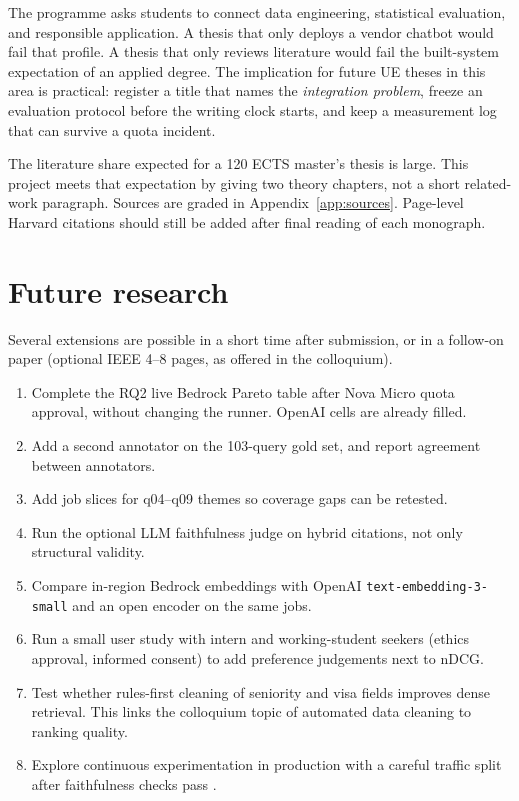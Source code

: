 The programme asks students to connect data engineering, statistical evaluation, and responsible application. A thesis that only deploys a vendor chatbot would fail that profile. A thesis that only reviews literature would fail the built-system expectation of an applied degree. The implication for future UE theses in this area is practical: register a title that names the \emph{integration problem}, freeze an evaluation protocol before the writing clock starts, and keep a measurement log that can survive a quota incident.

The literature share expected for a 120 ECTS master's thesis is large. This project meets that expectation by giving two theory chapters, not a short related-work paragraph. Sources are graded in Appendix~\ref{app:sources}. Page-level Harvard citations should still be added after final reading of each monograph.

\section{Future research}
\label{sec:future}

Several extensions are possible in a short time after submission, or in a follow-on paper (optional IEEE 4--8 pages, as offered in the colloquium).

\begin{enumerate}
  \item Complete the RQ2 live Bedrock Pareto table after Nova Micro quota approval, without changing the runner. OpenAI cells are already filled.
  \item Add a second annotator on the 103-query gold set, and report agreement between annotators.
  \item Add job slices for q04--q09 themes so coverage gaps can be retested.
  \item Run the optional LLM faithfulness judge on hybrid citations, not only structural validity.
  \item Compare in-region Bedrock embeddings with OpenAI \texttt{text-embedding-3-small} and an open encoder on the same jobs.
  \item Run a small user study with intern and working-student seekers (ethics approval, informed consent) to add preference judgements next to nDCG.
  \item Test whether rules-first cleaning of seniority and visa fields improves dense retrieval. This links the colloquium topic of automated data cleaning to ranking quality.
  \item Explore continuous experimentation in production with a careful traffic split after faithfulness checks pass .
\end{enumerate}

